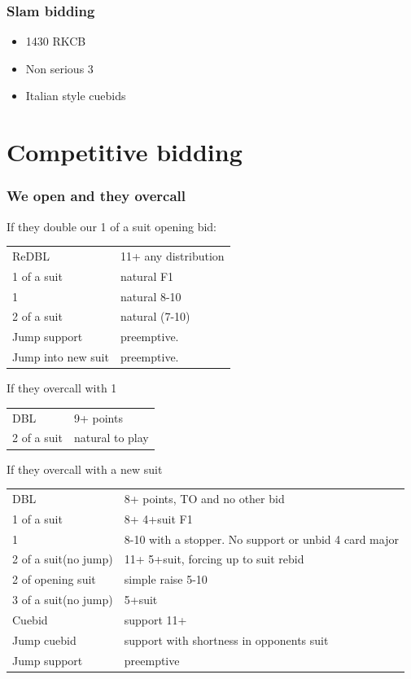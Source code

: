 \documentclass[11pt]{article}
\begin{document}
\subsubsection*{Slam bidding}
\label{sec:orgdd2c15b}
\begin{itemize}
\item 1430 RKCB
\item Non serious 3
\item Italian style cuebids
\end{itemize}
\section*{Competitive bidding}
\label{sec:org2c1bda6}
\subsubsection*{We open and they overcall}
\label{sec:orgf6cbeff}
If they double our 1 of a suit opening bid:
\begin{center}
\begin{tabular}{ll}
ReDBL & 11+ any distribution\\
1 of a suit & natural F1\\
1 & natural 8-10\\
2 of a suit & natural (7-10)\\
Jump support & preemptive.\\
Jump into new suit & preemptive.\\
\end{tabular}
\end{center}


If they overcall with 1\\
\begin{center}
\begin{tabular}{ll}
DBL & 9+ points\\
2 of a suit & natural to play\\
\end{tabular}
\end{center}

If they overcall with a new suit\\
\begin{center}
\begin{tabular}{ll}
DBL & 8+ points, TO and no other bid\\
1 of a suit & 8+ 4+suit F1\\
1 & 8-10 with a stopper. No support or unbid 4 card major\\
2 of a suit(no jump) & 11+ 5+suit, forcing up to suit rebid\\
2 of opening suit & simple raise 5-10\\
3 of a suit(no jump) & 5+suit\\
Cuebid & support 11+\\
Jump cuebid & support with shortness in opponents suit\\
Jump support & preemptive\\
\end{tabular}
\end{center}
\end{document}
